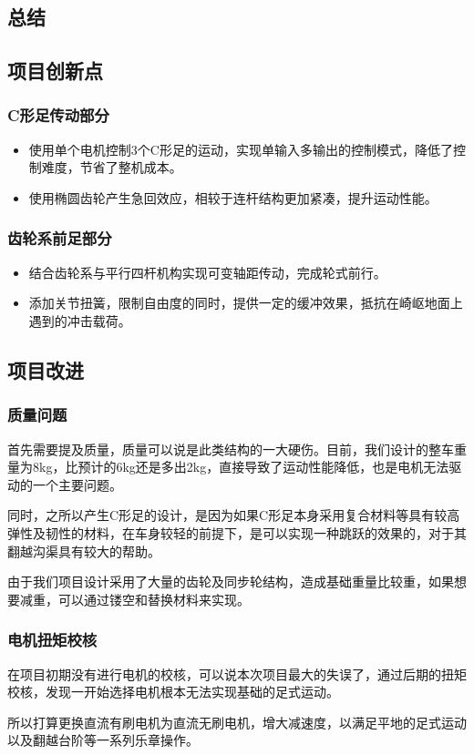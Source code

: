 \documentclass[12pt]{article}
\begin{document}
\begin{CJK}{UTF8}{gbsn}
\section{总结}
\subsection{项目创新点}
\subsubsection{C形足传动部分}
\begin{itemize}
\item 使用单个电机控制3个C形足的运动，实现单输入多输出的控制模式，降低了控制难度，节省了整机成本。
\item 使用椭圆齿轮产生急回效应，相较于连杆结构更加紧凑，提升运动性能。
\end{itemize}
\subsubsection{齿轮系前足部分}
\begin{itemize}
\item 结合齿轮系与平行四杆机构实现可变轴距传动，完成轮式前行。
\item 添加关节扭簧，限制自由度的同时，提供一定的缓冲效果，抵抗在崎岖地面上遇到的冲击载荷。
\end{itemize}
\subsection{项目改进}
\subsubsection{质量问题}
首先需要提及质量，质量可以说是此类结构的一大硬伤。目前，我们设计的整车重量为8kg，比预计的6kg还是多出2kg，直接导致了运动性能降低，也是电机无法驱动的一个主要问题。\par
同时，之所以产生C形足的设计，是因为如果C形足本身采用复合材料等具有较高弹性及韧性的材料，在车身较轻的前提下，是可以实现一种跳跃的效果的，对于其翻越沟渠具有较大的帮助。\par
由于我们项目设计采用了大量的齿轮及同步轮结构，造成基础重量比较重，如果想要减重，可以通过镂空和替换材料来实现。

\subsubsection{电机扭矩校核}
在项目初期没有进行电机的校核，可以说本次项目最大的失误了，通过后期的扭矩校核，发现一开始选择电机根本无法实现基础的足式运动。\par
所以打算更换直流有刷电机为直流无刷电机，增大减速度，以满足平地的足式运动以及翻越台阶等一系列乐章操作。


\end{CJK}
\end{document}
